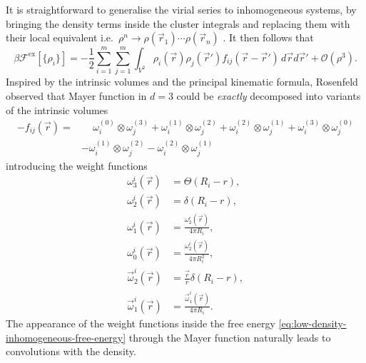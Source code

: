 It is straightforward to generalise the virial series to inhomogeneous systems, by bringing the density terms inside the cluster integrals and replacing them with their local equivalent i.e.\ $\rho^n \to \rho(\vec{r}_1) \cdots \rho(\vec{r}_n)$ \cite{StillingerJCP1962,RowlinsonPRSA1985}.
It then follows that
\begin{equation}\label{eq:low-density-inhomogeneous-free-energy}
  \beta \mathcal{F}^\mathrm{ex}[\{\rho_i\}]
  =
  - \frac{1}{2}
  \sum_{i = 1}^m \sum_{j = 1}^m \int_{V^2}
  \rho_i(\vec{r}) \rho_j(\vec{r}')
  f_{ij}(\vec{r} - \vec{r}')
  \, d\vec{r} d\vec{r}'
  + \mathcal{O}(\rho^3).
\end{equation}
Inspired by the intrinsic volumes and the principal kinematic formula, Rosenfeld observed that Mayer function in $d=3$ could be \emph{exactly} decomposed into variants of the intrinsic volumes%
\cite{RosenfeldPRL1989}
\begin{equation*}
  \begin{split}
    -f_{ij}(\vec{r})
    =& \quad\,
    \omega_i^{(0)} \otimes \omega_j^{(3)}
    + \omega_i^{(1)} \otimes \omega_j^{(2)}
    + \omega_i^{(2)} \otimes \omega_j^{(1)}
    + \omega_i^{(3)} \otimes \omega_j^{(0)}
    \\ &
    - \omega_i^{(1)} \otimes \omega_j^{(2)}
    - \omega_i^{(2)} \otimes \omega_j^{(1)}
  \end{split}
\end{equation*}
introducing the weight functions
\begin{subequations}
  \begin{align}
    \omega_3^i(\vec{r})
    &=
    \Theta(R_i - r),
    \\
    \omega_2^i(\vec{r})
    &=
    \delta(R_i - r),
    \\
    \omega_1^i(\vec{r})
    &=
    \frac{\omega_2^i(\vec{r})}{4\pi R_i},
    \\
    \omega_0^i(\vec{r})
    &=
    \frac{\omega_2^i(\vec{r})}{4\pi R_i^2},
    \\
    \vec{\omega}_2^i(\vec{r})
    &=
    \frac{\vec{r}}{r} \delta(R_i - r),
    \\
    \vec{\omega}_1^i(\vec{r})
    &=
    \frac{\vec{\omega}_1^i(\vec{r})}{4\pi R_i}.
  \end{align}
\end{subequations}
The appearance of the weight functions inside the free energy \eqref{eq:low-density-inhomogeneous-free-energy} through the Mayer function naturally leads to convolutions with the density.
